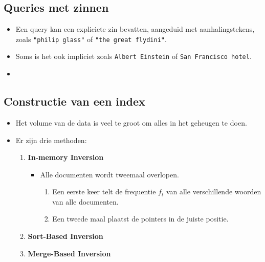 \subsection{Queries met zinnen}
\begin{itemize}
    \item Een query kan een expliciete zin bevatten, aangeduid met aanhalingstekens, zoals \texttt{"philip glass"} of \texttt{"the great flydini"}.
    \item Soms is het ook impliciet zoals \texttt{Albert Einstein} of \texttt{San Francisco hotel}.
    \item {}
\end{itemize}

\subsection{Constructie van een index}
\begin{itemize}
    \item Het volume van de data is veel te groot om alles in het geheugen te doen.
    \item Er zijn drie methoden:
    \begin{enumerate}
        \item \textbf{In-memory Inversion}
        \begin{itemize}
            \item Alle documenten wordt tweemaal overlopen.
            \begin{enumerate}
                \item Een eerste keer telt de frequentie $f_t$ van alle verschillende woorden van alle documenten.
                \item Een tweede maal plaatst de pointers in de juiste positie.
            \end{enumerate}
        \end{itemize}

        \item \textbf{Sort-Based Inversion}

        \item \textbf{Merge-Based Inversion}
    \end{enumerate}
\end{itemize}